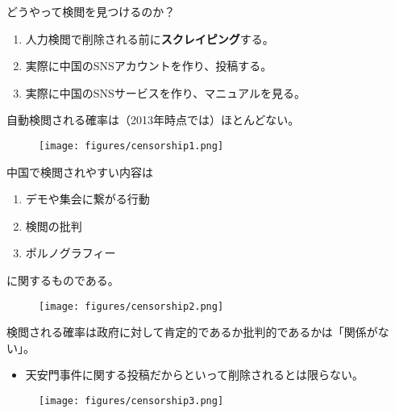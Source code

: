 \documentclass[
  xelatex,
  ja=standard]{bxjsarticle}
\providecommand{\tightlist}{%
  \setlength{\itemsep}{0pt}\setlength{\parskip}{0pt}}\usepackage{longtable,booktabs,array}
\begin{document}
どうやって検閲を見つけるのか？

\begin{enumerate}
\def\labelenumi{\arabic{enumi}.}
\tightlist
\item
  人力検閲で削除される前に\textbf{スクレイピング}する。
\item
  実際に中国のSNSアカウントを作り、投稿する。
\item
  実際に中国のSNSサービスを作り、マニュアルを見る。
\end{enumerate}

自動検閲される確率は（2013年時点では）ほとんどない。

\begin{figure}[htpb]

{\centering \texttt{[image: figures/censorship1.png]}

}

\caption{\citet{king2014}}

\end{figure}

中国で検閲されやすい内容は

\begin{enumerate}
\def\labelenumi{\arabic{enumi}.}
\tightlist
\item
  デモや集会に繋がる行動
\item
  検閲の批判
\item
  ポルノグラフィー
\end{enumerate}

に関するものである。

\begin{figure}[htpb]

{\centering \texttt{[image: figures/censorship2.png]}

}

\caption{\citet{king2013}}

\end{figure}

検閲される確率は政府に対して肯定的であるか批判的であるかは「関係がない」。

\begin{itemize}
\tightlist
\item
  天安門事件に関する投稿だからといって削除されるとは限らない。
\end{itemize}

\begin{figure}[htpb]

{\centering \texttt{[image: figures/censorship3.png]}

}

\caption{\citet{king2013}}

\end{figure}
\end{document}
